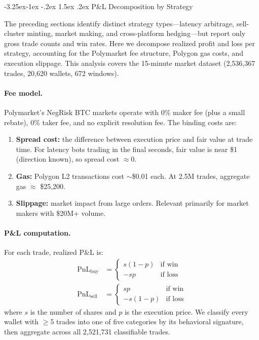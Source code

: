\documentclass[11pt,a4paper]{article}
\makeatletter
\renewcommand\subsection{\@startsection{subsection}{2}{\z@}%
  {-3.25ex\@plus -1ex \@minus -.2ex}%
  {1.5ex \@plus .2ex}%
  {\normalfont\large\bfseries}}
\makeatother
\begin{document}
\subsection{P\&L Decomposition by Strategy}

The preceding sections identify distinct strategy types---latency arbitrage, sell-cluster minting, market making, and cross-platform hedging---but report only gross trade counts and win rates. Here we decompose realized profit and loss per strategy, accounting for the Polymarket fee structure, Polygon gas costs, and execution slippage. This analysis covers the 15-minute market dataset (2,536,367 trades, 20,620 wallets, 672 windows).

\paragraph{Fee model.} Polymarket's NegRisk BTC markets operate with 0\% maker fee (plus a small rebate), 0\% taker fee, and no explicit resolution fee. The binding costs are:
\begin{enumerate}[nosep]
    \item \textbf{Spread cost:} the difference between execution price and fair value at trade time. For latency bots trading in the final seconds, fair value is near \$1 (direction known), so spread cost $\approx 0$.
    \item \textbf{Gas:} Polygon L2 transactions cost $\sim$\$0.01 each. At 2.5M trades, aggregate gas $\approx$ \$25,200.
    \item \textbf{Slippage:} market impact from large orders. Relevant primarily for market makers with \$20M+ volume.
\end{enumerate}

\paragraph{P\&L computation.} For each trade, realized P\&L is:
\begin{align}
    \text{PnL}_{\text{buy}} &= \begin{cases} s(1 - p) & \text{if win} \\ -sp & \text{if loss} \end{cases} \\
    \text{PnL}_{\text{sell}} &= \begin{cases} sp & \text{if win} \\ -s(1-p) & \text{if loss} \end{cases}
\end{align}
where $s$ is the number of shares and $p$ is the execution price. We classify every wallet with $\geq$5 trades into one of five categories by its behavioral signature, then aggregate across all 2,521,731 classifiable trades.
\end{document}
